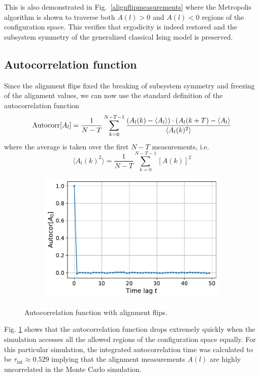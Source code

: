 \documentclass[../thesis_main.tex]{subfiles}
\begin{document}
This is also demonstrated in Fig.~\ref{alignflipmeasurements} where the Metropolis algorithm is shown to traverse both $A(l)>0$ and $A(l)<0$ regions of the configuration space. This verifies that ergodicity is indeed restored and the subsystem symmetry of the generalized classical Ising model is preserved.

\subsection{Autocorrelation function}
Since the alignment flips fixed the breaking of subsystem symmetry and freezing of the alignment values, we can now use the standard definition of the autocorrelation function 
\begin{equation}
    \text{Autocorr}[A_l] = \frac{1}{N-T} \sum_{k=0}^{N-T-1} \frac{(A_l(k) - \expval{A_l}) \cdot (A_l(k+T) - \expval{A_l}}{\expval{A_l(k)^2}}
\end{equation} 
where the average is taken over the first $N-T$ measurements, i.e.
\begin{equation}
    \langle{A_l(k)^2}\rangle = \frac{1}{N-T} \sum_{k=0}^{N-T-1} [A(k)]^2
\end{equation}
\begin{figure}[!htb]
    \centering
    \begin{subfigure}[b]{0.5\textwidth}
        \centering
        \includegraphics[width=\textwidth]{images/fix_subsystem_symmetry/Autocor[A(l)] (l=0).pdf}
    \end{subfigure}
    \caption{Autocorrelation function with alignment flips.}
    \label{alignflipautocorr}
\end{figure}
\FloatBarrier
Fig. \ref{alignflipautocorr} shows that the autocorrelation function drops extremely quickly when the simulation accesses all the allowed regions of the configuration space equally. For this particular simulation, the integrated autocorrelation time was calculated to be $\tau_\text{int} \approx 0.529$ implying that the alignment measurements $A(l)$ are highly uncorrelated in the Monte Carlo simulation.
\end{document}
